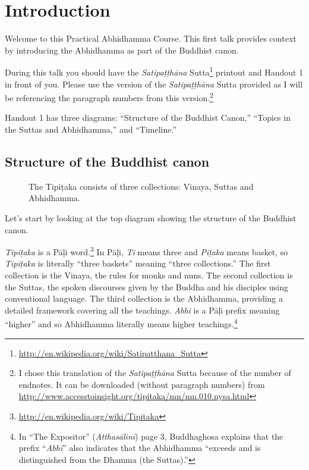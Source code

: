 \section{Introduction}

Welcome to this Practical Abhidhamma Course. This first talk provides context by introducing the Abhidhamma as part of the Buddhist canon.

During this talk you should have the \textit{Satipaṭṭhāna} Sutta\footnote{\url{http://en.wikipedia.org/wiki/Satipatthana_Sutta}} printout and Handout 1 in front of you. Please use the version of the \textit{Satipaṭṭhāna} Sutta provided as I will be referencing the paragraph numbers from this version.\footnote{I chose this translation of the \textit{Satipaṭṭhāna} Sutta because of the number of endnotes. It can be downloaded (without paragraph numbers) from \url{http://www.accesstoinsight.org/tipitaka/mn/mn.010.nysa.html}} 

Handout 1 has three diagrams: “Structure of the Buddhist Canon,” “Topics in the Suttas and Abhidhamma,” and “Timeline.”

\subsection*{Structure of the Buddhist canon}

\begin{figure}[H]
\centering

\caption{The Tipiṭaka consists of three collections: Vinaya, Suttas and Abhidhamma.}
\label{fig:Tipitaka}
\end{figure}

Let’s start by looking at the top diagram showing the structure of the Buddhist canon.

\textit{Tipiṭaka} is a Pāḷi word.\footnote{\url{http://en.wikipedia.org/wiki/Tipitaka}} In Pāḷi, \textit{Ti} means three and \textit{Piṭaka} means basket, so \textit{Tipiṭaka} is literally “three baskets” meaning “three collections.” The first collection is the Vinaya, the rules for monks and nuns. The second collection is the Suttas, the spoken discourses given by the Buddha and his disciples using conventional language. The third collection is the Abhidhamma, providing a detailed framework covering all the teachings. \textit{Abhi} is a Pāḷi prefix meaning “higher” and so Abhidhamma literally means higher teachings.\footnote{In “The Expositor” (\textit{Atthasālinī}) page 3, Buddhaghosa explains that the prefix “\textit{Abhi}” also indicates that the Abhidhamma “exceeds and is distinguished from the Dhamma (the Suttas).”}

